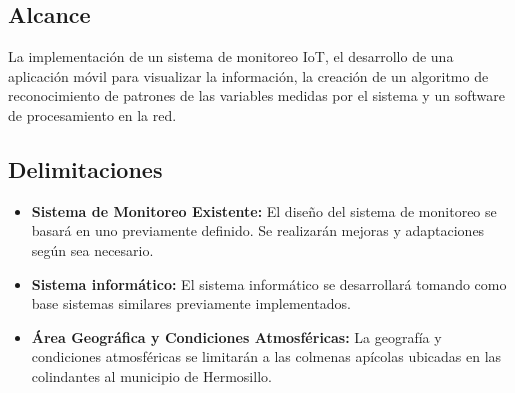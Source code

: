 
\subsection{Alcance}
La implementación de un sistema de monitoreo IoT, el desarrollo de una aplicación móvil para visualizar la información, la creación de un algoritmo de reconocimiento de patrones de las variables medidas por el sistema y un software de procesamiento en la red.

\subsection{Delimitaciones}
\begin{itemize}
    \item \textbf{Sistema de Monitoreo Existente:} El diseño del sistema de monitoreo se basará en uno previamente definido. Se realizarán mejoras y adaptaciones según sea necesario.
    \item \textbf{Sistema informático:} El sistema informático se desarrollará tomando como base sistemas similares previamente implementados.
    \item \textbf{Área Geográfica y Condiciones Atmosféricas:} La geografía y condiciones atmosféricas se limitarán a las colmenas apícolas ubicadas en las colindantes al municipio de Hermosillo.
\end{itemize}

